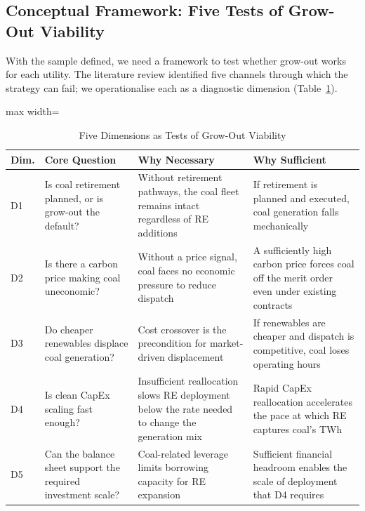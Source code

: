 \documentclass[review,3p,authoryear]{elsarticle}
\begin{document}
\subsection{Conceptual Framework: Five Tests of Grow-Out Viability}

With the sample defined, we need a framework to test whether grow-out works for each utility. The literature review identified five channels through which the strategy can fail; we operationalise each as a diagnostic dimension (Table~\ref{tab:framework}).

\begin{table}[H]
\centering
\caption{Five Dimensions as Tests of Grow-Out Viability}
\label{tab:framework}
\begin{adjustbox}{max width=\linewidth}
{\footnotesize
\begin{tabular}{@{}p{}p{}p{}p{}@{}}
\toprule
\textbf{Dim.} & \textbf{Core Question} & \textbf{Why Necessary} & \textbf{Why Sufficient} \\
\midrule
D1 & Is coal retirement planned, or is grow-out the default? & Without retirement pathways, the coal fleet remains intact regardless of RE additions & If retirement is planned and executed, coal generation falls mechanically \\
D2 & Is there a carbon price making coal uneconomic? & Without a price signal, coal faces no economic pressure to reduce dispatch & A sufficiently high carbon price forces coal off the merit order even under existing contracts \\
D3 & Do cheaper renewables displace coal generation? & Cost crossover is the precondition for market-driven displacement & If renewables are cheaper and dispatch is competitive, coal loses operating hours \\
D4 & Is clean CapEx scaling fast enough? & Insufficient reallocation slows RE deployment below the rate needed to change the generation mix & Rapid CapEx reallocation accelerates the pace at which RE captures coal's TWh \\
D5 & Can the balance sheet support the required investment scale? & Coal-related leverage limits borrowing capacity for RE expansion & Sufficient financial headroom enables the scale of deployment that D4 requires \\
\bottomrule
\end{tabular}
}
\end{adjustbox}
\end{table}
\end{document}
